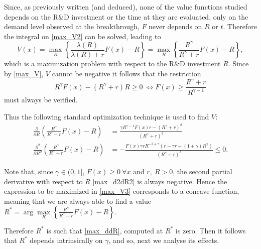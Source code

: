 Since, as previously written (and deduced), none of the value functions studied depends on the R\&D investment or the time at they are evaluated, only on the demand level observed at the breakthrough, $F$ never depends on $R$ or $t$. Therefore the integral on \eqref{max_V2} can be solved, leading to
\begin{equation}
V(x)=\max_R \left\{ \frac{\lambda(R)}{\lambda(R)+r} F(x) -R \right\}=\max_R \left\{ \frac{R^\gamma}{R^\gamma+r} F(x) -R \right\},
\label{max_V3}
\end{equation}
which is a maximization problem with respect to the R\&D investment $R$. Since by \eqref{max_V}, $V$ cannot be negative it follows that the restriction
\begin{equation}
R^\gamma F(x) - (R^\gamma+r)R \geq 0 \ \Leftrightarrow  F(x) \geq \frac{R^\gamma+r}{R^{\gamma-1}}
	\label{max_rest}
\end{equation}
must always be verified.

Thus the following standard optimization technique is used to find $V$:
\begin{align}
\frac{\partial}{\partial R} \left( \frac{R^\gamma}{R^\gamma+r} F(x) -R \right) &= \frac{\gamma R^{\gamma-1}F(x)r-(R^\gamma+r)^2}{(R^\gamma+r)^2} \label{max_ddR}\\
\frac{\partial^2}{\partial R^2} \left( \frac{R^\gamma}{R^\gamma+r} F(x) -R \right) &=
-\frac{F(x) \gamma r R^{-2+\gamma}(r-\gamma r+(1+\gamma)R^\gamma)}{(R^\gamma+r)^3}\leq 0.
\label{max_d2dR2}
\end{align}

Note that, since $\gamma \in (0,1]$, $F(x)\geq0 \ \forall x$ and $r, \ R >0$, the second partial derivative with respect to $R$ \eqref{max_d2dR2} is always negative. Hence the expression to be maximized in \eqref{max_V3} corresponds to a concave function, meaning that we are always able to find a value $R^*=\arg \underset{R}{\max} \left\{ \frac{R^\gamma}{R^\gamma+r} F(x) -R \right\}$.

Therefore $R^*$ is such that \ref{max_ddR}, computed at $R^*$ is zero. Then it follows that $R^*$ depends intrinsically on $\gamma$, and so, next we analyse its effects.



